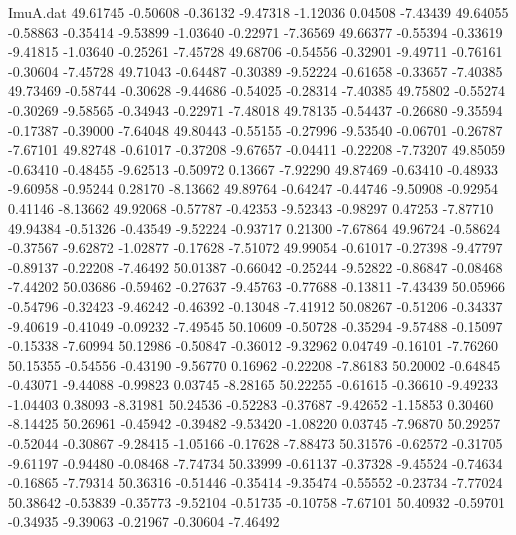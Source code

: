 \begin{filecontents}{ImuA.dat}
  49.61745   -0.50608   -0.36132   -9.47318   -1.12036    0.04508   -7.43439
  49.64055   -0.58863   -0.35414   -9.53899   -1.03640   -0.22971   -7.36569
  49.66377   -0.55394   -0.33619   -9.41815   -1.03640   -0.25261   -7.45728
  49.68706   -0.54556   -0.32901   -9.49711   -0.76161   -0.30604   -7.45728
  49.71043   -0.64487   -0.30389   -9.52224   -0.61658   -0.33657   -7.40385
  49.73469   -0.58744   -0.30628   -9.44686   -0.54025   -0.28314   -7.40385
  49.75802   -0.55274   -0.30269   -9.58565   -0.34943   -0.22971   -7.48018
  49.78135   -0.54437   -0.26680   -9.35594   -0.17387   -0.39000   -7.64048
  49.80443   -0.55155   -0.27996   -9.53540   -0.06701   -0.26787   -7.67101
  49.82748   -0.61017   -0.37208   -9.67657   -0.04411   -0.22208   -7.73207
  49.85059   -0.63410   -0.48455   -9.62513   -0.50972    0.13667   -7.92290
  49.87469   -0.63410   -0.48933   -9.60958   -0.95244    0.28170   -8.13662
  49.89764   -0.64247   -0.44746   -9.50908   -0.92954    0.41146   -8.13662
  49.92068   -0.57787   -0.42353   -9.52343   -0.98297    0.47253   -7.87710
  49.94384   -0.51326   -0.43549   -9.52224   -0.93717    0.21300   -7.67864
  49.96724   -0.58624   -0.37567   -9.62872   -1.02877   -0.17628   -7.51072
  49.99054   -0.61017   -0.27398   -9.47797   -0.89137   -0.22208   -7.46492
  50.01387   -0.66042   -0.25244   -9.52822   -0.86847   -0.08468   -7.44202
  50.03686   -0.59462   -0.27637   -9.45763   -0.77688   -0.13811   -7.43439
  50.05966   -0.54796   -0.32423   -9.46242   -0.46392   -0.13048   -7.41912
  50.08267   -0.51206   -0.34337   -9.40619   -0.41049   -0.09232   -7.49545
  50.10609   -0.50728   -0.35294   -9.57488   -0.15097   -0.15338   -7.60994
  50.12986   -0.50847   -0.36012   -9.32962    0.04749   -0.16101   -7.76260
  50.15355   -0.54556   -0.43190   -9.56770    0.16962   -0.22208   -7.86183
  50.20002   -0.64845   -0.43071   -9.44088   -0.99823    0.03745   -8.28165
  50.22255   -0.61615   -0.36610   -9.49233   -1.04403    0.38093   -8.31981
  50.24536   -0.52283   -0.37687   -9.42652   -1.15853    0.30460   -8.14425
  50.26961   -0.45942   -0.39482   -9.53420   -1.08220    0.03745   -7.96870
  50.29257   -0.52044   -0.30867   -9.28415   -1.05166   -0.17628   -7.88473
  50.31576   -0.62572   -0.31705   -9.61197   -0.94480   -0.08468   -7.74734
  50.33999   -0.61137   -0.37328   -9.45524   -0.74634   -0.16865   -7.79314
  50.36316   -0.51446   -0.35414   -9.35474   -0.55552   -0.23734   -7.77024
  50.38642   -0.53839   -0.35773   -9.52104   -0.51735   -0.10758   -7.67101
  50.40932   -0.59701   -0.34935   -9.39063   -0.21967   -0.30604   -7.46492

\end{filecontents}
